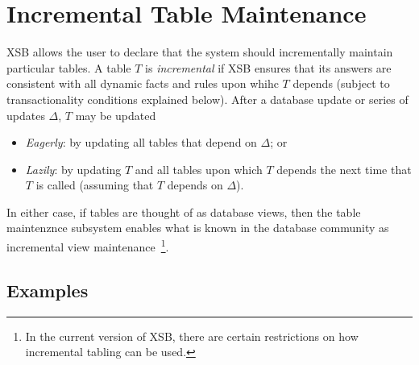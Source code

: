 \section{Incremental Table Maintenance} \label{sec:incremental_tabling}


XSB allows the user to declare that the system should incrementally
maintain particular tables.  A table $T$ is {\em incremental} if XSB
ensures that its answers are consistent with all dynamic facts and
rules upon whihc $T$ depends (subject to transactionality conditions
explained below).  After a database update or series of updates
$\Delta$, $T$ may be updated
\begin{itemize}
\item {\em Eagerly}: by updating all tables that depend on $\Delta$; or
%
\item {\em Lazily}: by updating $T$ and all tables upon which $T$
  depends the next time that $T$ is called (assuming that $T$ depends
  on $\Delta$).
\end{itemize}
%
In either case, if tables are thought of as database views, then the
table maintenznce subsystem enables what is known in the database
community as incremental view maintenance~\footnote{In the current
  version of XSB, there are certain restrictions on how incremental
  tabling can be used.}.

\subsection{Examples} \label{sec:incr_examples}


